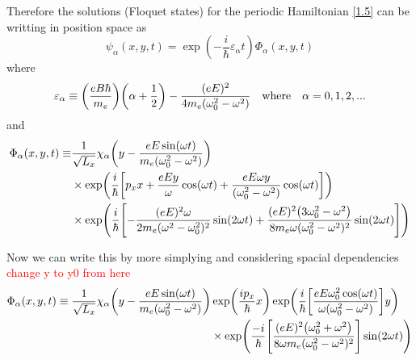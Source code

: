 \vspace{5mm}
\noindent
Therefore the solutions (Floquet states) for the periodic Hamiltonian \eqref{1.5} can be writting in position space as
\begin{equation} \label{3.17}
  \psi_{\alpha}(x,y,t) =
  \exp(-\frac{i}{\hbar}\varepsilon_{\alpha}t)   \Phi_{\alpha} (x,y,t)
\end{equation}
where
\begin{equation} \label{3.18}
  \varepsilon_{\alpha} \equiv
  \qty(\frac{eB\hbar }{m_e})\qty(\alpha + \frac{1}{2}) -
  \frac{(eE)^2}{4m_e(\omega_0^2 - \omega^2)}
  \quad \text{where} \quad
  \alpha = 0,1,2, ...
\end{equation}
and
\begin{equation} \label{3.19}
  \begin{aligned}
    \Phi_{\alpha}(x,y,t) \equiv &
    \frac{1}{\sqrt{L_x}}
    \chi_{\alpha}\qty(y - \frac{eE\sin(\omega t)}{m_e(\omega_0^2 - \omega^2)} ) \\
    & \times
    \exp(
     \frac{i}{\hbar}\qty[
     p_x x +
     \frac{eEy}{\omega}\cos(\omega t)+
     \frac{eE\omega y }{(\omega_0^2 - \omega^2)}\cos(\omega t)
     ])\\
     & \times
     \exp(\frac{i}{\hbar}\qty[
     -\frac{(eE)^2\omega }{2m_e(\omega^2 - \omega_0^2)^2}\sin(2\omega t)
     + \frac{(eE)^2\qty(3\omega_0^2 - \omega^2)}{8m_e\omega(\omega_0^2 - \omega^2)^2} \sin(2\omega t)
  ])
  \end{aligned}
\end{equation}

\noindent
Now we can write this by more simplying and considering spacial dependencies
\textcolor{red}{change y to y0 from here}
\begin{equation} \label{3.20}
  \begin{aligned}
    \Phi_{\alpha}(x,y,t)  \equiv
    \frac{1}{\sqrt{L_x}}
    \chi_{\alpha}\qty(y - \frac{eE\sin(\omega t)}{m_e(\omega_0^2 - \omega^2)} ) &
    \exp( \frac{i p_x }{\hbar}x )
    \exp(
     \frac{i}{\hbar}
     \qty[
     \frac{eE\omega_0^2\cos(\omega t)}{\omega(\omega_0^2 - \omega^2)}]
     y)\\
     & \times
     \exp(\frac{-i}{\hbar}
     \qty[
     \frac{(eE)^2\qty(\omega_0^2 + \omega^2)}{8\omega m_e(\omega_0^2 - \omega^2)^2}
     ]\sin(2\omega t)
     )
  \end{aligned}
\end{equation}


